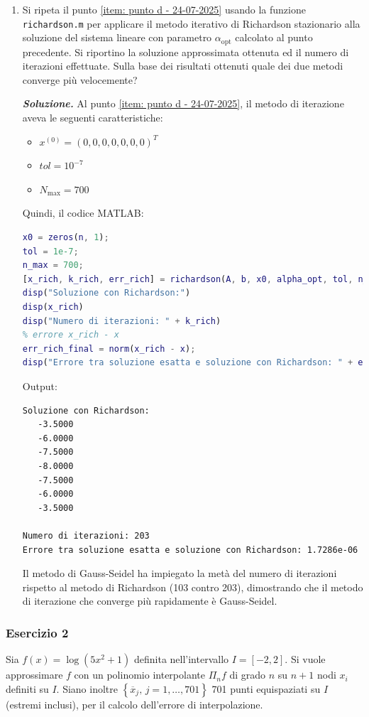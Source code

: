 \begin{enumerate}
    \item Si ripeta il punto \ref{item: punto d - 24-07-2025} usando la funzione \texttt{richardson.m} per applicare il metodo iterativo di Richardson stazionario alla soluzione del sistema lineare con parametro $\alpha_{\mathrm{opt}}$ calcolato al punto precedente. Si riportino la soluzione approssimata ottenuta ed il numero di iterazioni effettuate. Sulla base dei risultati ottenuti quale dei due metodi converge più velocemente?
    
    \textcolor{Green3}{\textbf{\emph{Soluzione.}}} Al punto \ref{item: punto d - 24-07-2025}, il metodo di iterazione aveva le seguenti caratteristiche:
    \begin{itemize}
        \item $x^{(0)} = \left(0, 0, 0, 0, 0, 0, 0\right)^{T}$
        \item $tol = 10^{-7}$
        \item $N_{\max} = 700$
    \end{itemize}
    Quindi, il codice MATLAB:
    \begin{lstlisting}[language=MATLAB]
x0 = zeros(n, 1);
tol = 1e-7;
n_max = 700;
[x_rich, k_rich, err_rich] = richardson(A, b, x0, alpha_opt, tol, n_max);
disp("Soluzione con Richardson:")
disp(x_rich)
disp("Numero di iterazioni: " + k_rich)
% errore x_rich - x
err_rich_final = norm(x_rich - x);
disp("Errore tra soluzione esatta e soluzione con Richardson: " + err_rich_final)\end{lstlisting}
    Output:
    \begin{lstlisting}
Soluzione con Richardson:
   -3.5000
   -6.0000
   -7.5000
   -8.0000
   -7.5000
   -6.0000
   -3.5000

Numero di iterazioni: 203
Errore tra soluzione esatta e soluzione con Richardson: 1.7286e-06\end{lstlisting}
    Il metodo di Gauss-Seidel ha impiegato la metà del numero di iterazioni rispetto al metodo di Richardson (103 contro 203), dimostrando che il metodo di iterazione che converge più rapidamente è Gauss-Seidel.
\end{enumerate}

\newpage

\subsubsection*{Esercizio 2}

Sia $f(x) = \log(5x^{2} + 1)$ definita nell'intervallo $I = \left[-2, 2\right]$. Si vuole approssimare $f$ con un polinomio interpolante $\Pi_{n} f$ di grado $n$ su $n+1$ nodi $x_{i}$ definiti su $I$. Siano inoltre $\left\{\overline{x}_{j}, \, j = 1, \dots, 701 \right\}$ 701 punti equispaziati su $I$ (estremi inclusi), per il calcolo dell'errore di interpolazione.

